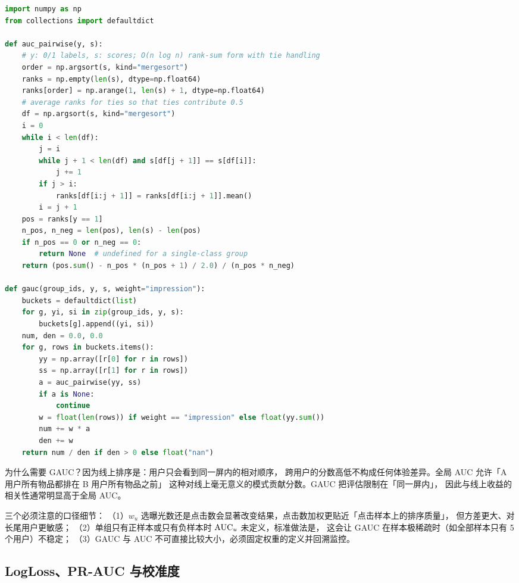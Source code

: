 \begin{lstlisting}[style=growth, language=Python, caption={GAUC 的分组加权实现（跳过单类分组，权重取曝光数）}]
import numpy as np
from collections import defaultdict

def auc_pairwise(y, s):
    # y: 0/1 labels, s: scores; O(n log n) rank-sum form with tie handling
    order = np.argsort(s, kind="mergesort")
    ranks = np.empty(len(s), dtype=np.float64)
    ranks[order] = np.arange(1, len(s) + 1, dtype=np.float64)
    # average ranks for ties so that ties contribute 0.5
    df = np.argsort(s, kind="mergesort")
    i = 0
    while i < len(df):
        j = i
        while j + 1 < len(df) and s[df[j + 1]] == s[df[i]]:
            j += 1
        if j > i:
            ranks[df[i:j + 1]] = ranks[df[i:j + 1]].mean()
        i = j + 1
    pos = ranks[y == 1]
    n_pos, n_neg = len(pos), len(s) - len(pos)
    if n_pos == 0 or n_neg == 0:
        return None  # undefined for a single-class group
    return (pos.sum() - n_pos * (n_pos + 1) / 2.0) / (n_pos * n_neg)

def gauc(group_ids, y, s, weight="impression"):
    buckets = defaultdict(list)
    for g, yi, si in zip(group_ids, y, s):
        buckets[g].append((yi, si))
    num, den = 0.0, 0.0
    for g, rows in buckets.items():
        yy = np.array([r[0] for r in rows])
        ss = np.array([r[1] for r in rows])
        a = auc_pairwise(yy, ss)
        if a is None:
            continue
        w = float(len(rows)) if weight == "impression" else float(yy.sum())
        num += w * a
        den += w
    return num / den if den > 0 else float("nan")
\end{lstlisting}

为什么需要 GAUC？因为线上排序是：用户只会看到同一屏内的相对顺序，
跨用户的分数高低不构成任何体验差异。全局 AUC 允许「A 用户所有物品都排在 B 用户所有物品之前」
这种对线上毫无意义的模式贡献分数。GAUC 把评估限制在「同一屏内」，
因此与线上收益的相关性通常明显高于全局 AUC。

三个必须注意的口径细节：
（1）$w_u$ 选曝光数还是点击数会显著改变结果，点击数加权更贴近「点击样本上的排序质量」，
但方差更大、对长尾用户更敏感；
（2）单组只有正样本或只有负样本时 $\operatorname{AUC}_u$ 未定义，标准做法是，
这会让 GAUC 在样本极稀疏时（如全部样本只有 5 个用户）不稳定；
（3）GAUC 与 AUC 不可直接比较大小，必须固定权重的定义并回溯监控。

\subsection{LogLoss、PR-AUC 与校准度}

